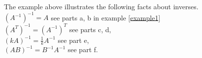\documentclass{ximera}
\begin{document}
The example above illustrates the following facts about inverses. \\
$\left(A^{-1}\right)^{-1}=A$ \hspace{2cm} see parts a, b in example \ref{example1}\\
$\left(A^{T}\right)^{-1}= \left(A^{-1}\right)^{T}$ \hspace{2cm} see parts c, d, \\
$\left(kA\right)^{-1}= \frac{1}{k}A^{-1}$ \hspace{2cm} see part e,\\
$(AB)^{-1}= B^{-1}A^{-1}$ \hspace{2cm} see part f.
\end{document}
